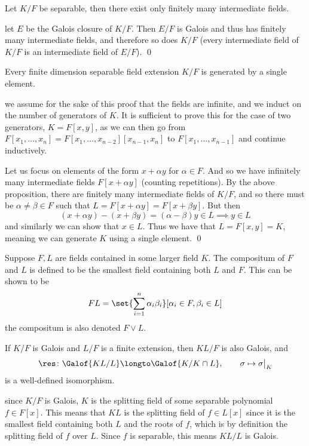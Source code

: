 \bprop

    Let $K/F$ be separable, then there exist only finitely many intermediate fields.

\eprop

\Proof let $E$ be the Galois closure of $K/F$.
Then $E/F$ is Galois and thus has finitely many intermediate fields, and therefore so does $K/F$ (every intermediate field of $K/F$ is an intermediate field of $E/F$).
\qed

\bthrm[title=Steinitz's Theorem, name=steinitz]

    Every finite dimension separable field extension $K/F$ is generated by a single element.

\ethrm

\Proof we assume for the sake of this proof that the fields are infinite, and we induct on the number of generators of $K$.
It is sufficient to prove this for the case of two generators, $K=F[x,y]$, as we can then go from $F[x_1,\dots,x_n]=F[x_1,\dots,x_{n-2}][x_{n-1},x_n]$ to $F[x_1,\dots,x_{n-1}]$ and continue inductively.

Let us focus on elements of the form $x+\alpha y$ for $\alpha\in F$.
And so we have infinitely many intermediate fields $F[x+\alpha y]$ (counting repetitions).
By the above proposition, there are finitely many intermediate fields of $K/F$, and so there must be $\alpha\neq\beta\in F$ such that $L=F[x+\alpha y]=F[x+\beta y]$.
But then
$$ (x+\alpha y) - (x+\beta y) = (\alpha-\beta)y \in L \implies y\in L $$
and similarly we can show that $x\in L$.
Thus we have that $L=F[x,y]=K$, meaning we can generate $K$ using a single element.
\qed

\bdefn

    Suppose $F,L$ are fields contained in some larger field $K$.
    The {\emphcolor compositum} of $F$ and $L$ is defined to be the smallest field containing both $L$ and $F$.
    This can be shown to be
    $$ FL = \set{\sum_{i=1}^n\alpha_i\beta_i}[\alpha_i\in F,\beta_i\in L] $$
    the compositum is also denoted $F\vee L$.

\edefn

\bprop[name=res]

    If $K/F$ is Galois and $L/F$ is a finite extension, then $KL/F$ is also Galois, and
    $$ \res\colon\Galof{KL/L}\longto\Galof{K/K\cap L},\qquad \sigma\mapsto\sigma\bigl|_K $$
    is a well-defined isomorphism.

\eprop

\Proof since $K/F$ is Galois, $K$ is the splitting field of some separable polynomial $f\in F[x]$.
This means that $KL$ is the splitting field of $f\in L[x]$ since it is the smallest field containing both $L$ and the roots of $f$, which is by definition the splitting field of $f$ over $L$.
Since $f$ is separable, this means $KL/L$ is Galois.

